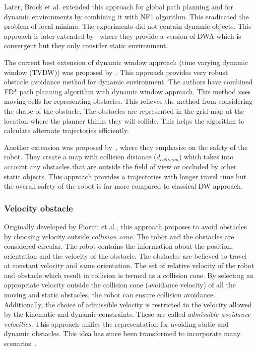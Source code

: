 Later, Brock et al.\cite{brock1999high} extended this approach for global path planning and for dynamic environments by combining it with NF1 algorithm. This eradicated the problem of local minima. 
The experiments did not contain dynamic objects.
This approach is later extended by~\cite{ogren2005convergent} where they provide a version of DWA which is convergent but they only consider static environment.

The current best extension of dynamic window approach (time varying dynamic window (TVDW)) was proposed by~\cite{seder2007dynamic}. This approach provides very robust obstacle avoidance method for dynamic environment.
The authors have combined FD* path planning algorithm with dynamic window approach.
This method uses moving cells for representing obstacles. This relieves the method from considering the shape of the obstacle.
The obstacles are represented in the grid map at the location where the planner thinks they will collide. This helps the algorithm to calculate alternate trajectories efficiently.

Another extension was proposed by~\cite{chung2009safe}, where they emphasise on the safety of the robot. They create a map with collision distance ($d_{collision}$) which takes into account any obstacles that are outside the field of view or occluded by other static objects. This approach provides a trajectories with longer travel time but the overall safety of the robot is far more compared to classical DW approach.

\subsubsection{Velocity obstacle}%
\label{subsub:velocity_obstacle}

Originally developed by Fiorini et al.\cite{fiorini1998motion}, this approach proposes to avoid obstacles by choosing velocity outside \textit{collision cone}.
The robot and the obstacles are considered circular. The robot contains the information about the position, orientation and the velocity of the obstacle.
The obstacles are believed to travel at constant velocity and same orientation.
The set of relative velocity of the robot and obstacle which result in collision is termed as a collision cone. 
By selecting an appropriate velocity outside the collision cone (avoidance velocity) of all the moving and static obstacles, the robot can ensure collision avoidance. Additionally, the choice of admissible velocity is restricted to the velocity allowed by the kinematic and dynamic constraints. These are called \textit{admissible avoidance velocities}.
This approach unifies the representation for avoiding static and dynamic obstacles.
This idea has since been transformed to incorporate many scenarios~\cite{prassler2001robotics}.

